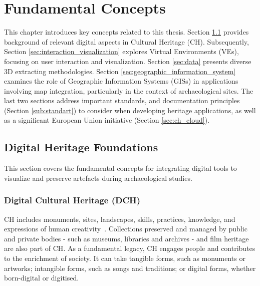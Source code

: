
%

\chapter{Fundamental Concepts}
\label{cha:fundamental_concepts}

This chapter introduces key concepts related to this thesis. Section \ref{sec:digital_heritage_foundation}
provides background of relevant digital aspects in Cultural Heritage (\gls{CH}).
Subsequently, Section \ref{sec:interaction_visualization} explores Virtual Environments (\glspl{VE}), focusing on user interaction and visualization. 
Section \ref{sec:data} presents diverse \gls{3D} extracting methodologies.
Section \ref{sec:geographic_information_system} examines the role of Geographic Information Systems (\glspl{GIS}) in applications involving map integration, particularly in the context of archaeological sites. 
The last two sections address important standards, and documentation principles (Section \ref{sub:standart}) to consider when developing heritage applications, as well as a significant European Union initiative (Section \ref{sec:ch_cloud}).

\section{Digital Heritage Foundations}
\label{sec:digital_heritage_foundation}

This section covers the fundamental concepts for integrating digital tools to visualize and preserve artefacts during archaeological studies.

\subsection{Digital Cultural Heritage (\gls{DCH})}
\label{sec:digital_heritage}

\gls{CH} includes monuments, sites, landscapes, skills, practices, knowledge, and expressions of human creativity~\cite{eu_cultural_heritage}. Collections preserved and managed by public and private bodies - such as museums, libraries and archives - and film heritage are also part of \gls{CH}. 
As a fundamental legacy, \gls{CH} engages people and contributes to the enrichment of society. It can take tangible forms, such as monuments or artworks; intangible forms, such as songs and traditions; or digital forms, whether born-digital or digitised.

